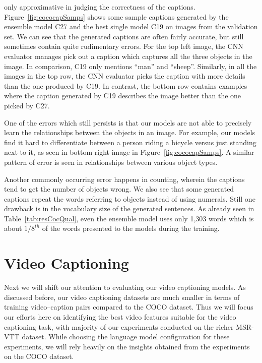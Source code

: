 only approximative in judging the correctness of the captions.
Figure~\ref{fig:cococapSamps} shows some sample captions generated by the
ensemble model C27 and the best single model C19 on images from the validation
set.
We can see that the generated captions are often fairly accurate, but still
sometimes contain quite rudimentary errors.
For the top left image, the CNN evaluator manages pick out a caption which
captures all the three objects in the image.
In comparison, C19 only mentions ``man'' and ``sheep''.
Similarly, in all the images in the top row, the CNN evaluator picks the caption
with more details than the one produced by C19.
In contrast, the bottom row contains examples where the caption generated by C19
describes the image better than the one picked by C27.

One of the errors which still persists is that our models are not able to
precisely learn the relationships between the objects in an image.
For example, our models find it hard to differentiate between a person riding a
bicycle versus just standing next to it, as seen in bottom right image in
Figure~\ref{fig:cococapSamps}.
A similar pattern of error is seen in relationships between various object
types.

Another commonly occurring error happens in counting, wherein the captions tend
to get the number of objects wrong.
We also see that some generated captions repeat the words referring to objects
instead of using numerals.
Still one drawback is in the vocabulary size of the generated sentences.
As already seen in Table~\ref{tab:resCocQual}, even the ensemble model uses only
1,303 words which is about $1/8^{th}$ of the words presented to the models
during the training.

\section{Video Captioning}
Next we will shift our attention to evaluating our video captioning models.
As discussed before, our video captioning datasets are much smaller in terms of
training video--caption pairs compared to the COCO dataset.
Thus we will focus our efforts here on identifying the best video features
suitable for the video captioning task, with majority of our experiments
conducted on the richer MSR-VTT dataset.
While choosing the language model configuration for these experiments, we will
rely heavily on the insights obtained from the experiments on the COCO dataset.

